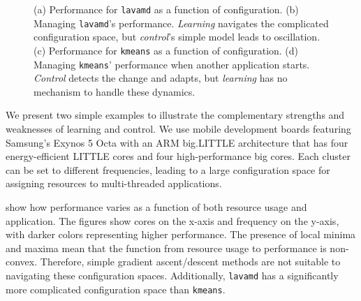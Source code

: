 \begin{figure}
  \subfloat[]
  {
    
    \label{fig:lavamd_timeline}
  }
  \subfloat[]
  {
    
    \label{fig:kmeans_timeline}    
  }
  \caption{(a) Performance for \texttt{lavamd} as a function of
    configuration. (b) Managing \texttt{lavamd}'s performance.
    \emph{Learning} navigates the complicated configuration space, but
    \emph{control}'s simple model leads to oscillation. (c)
    Performance for \texttt{kmeans} as a function of configuration.
    (d) Managing \texttt{kmeans}' performance when another application
    starts. \emph{Control} detects the change and adapts, but
    \emph{learning} has no mechanism to handle these dynamics.}
  \label{fig:learning-models}
\end{figure}



We present two simple examples to illustrate the complementary
strengths and weaknesses of learning and control.  We use mobile
development boards featuring Samsung's Exynos 5 Octa with an ARM
big.LITTLE architecture that has four energy-efficient LITTLE cores
and four high-performance big cores.  Each cluster can be set to
different frequencies, leading to a large configuration space for
assigning resources to multi-threaded applications.

 show how performance
varies as a function of both resource usage and application.  The
figures show cores on the x-axis and frequency on the y-axis, with
darker colors representing higher performance.  The presence of local
minima and maxima mean that the function from resource usage to
performance is non-convex.  Therefore, simple gradient ascent/descent
methods are not suitable to navigating these configuration spaces.
Additionally, \texttt{lavamd} has a significantly more complicated
configuration space than \texttt{kmeans}.

